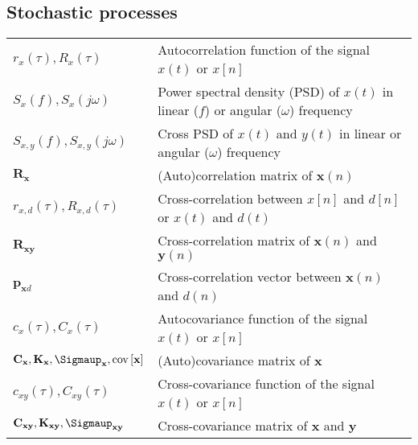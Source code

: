 \documentclass{article}
\begin{document}
\subsection{Stochastic processes}
\begin{xltabular}{\textwidth}{XX}
    \(r_x(\tau), R_x(\tau)\) & Autocorrelation function of the signal \(x(t)\) or \(x[n]\) \cite{nossekAdaptiveArraySignal2015}\\
    \(S_x(f), S_x(j\omega)\) & Power spectral density (PSD) of \(x(t)\) in linear (\(f\)) or angular (\(\omega\)) frequency\\
    \(S_{x,y}(f), S_{x,y}(j\omega)\) & Cross PSD of \(x(t)\) and \(y(t)\) in linear or angular (\(\omega\)) frequency\\
    \(\mathbf{R}_\mathbf{x}\) & (Auto)correlation matrix of \(\mathbf{x}(n)\) \\
    \(r_{x,d}(\tau), R_{x,d}(\tau)\) & Cross-correlation between \(x[n]\) and \(d[n]\) or \(x(t)\) and \(d(t)\) \cite{nossekAdaptiveArraySignal2015}\\
    \(\mathbf{R}_\mathbf{xy}\) & Cross-correlation matrix of \(\mathbf{x}(n)\) and \(\mathbf{y}(n)\)\\
    \(\mathbf{p}_{\mathbf{x}d}\)& Cross-correlation vector between \(\mathbf{x}(n)\) and \(d(n)\) \cite{dinizAdaptiveFiltering1997} \\
    \(c_x(\tau), C_x(\tau)\) & Autocovariance function of the signal \(x(t)\) or \(x[n]\) \cite{nossekAdaptiveArraySignal2015}\\
    \(\mathbf{C}_\mathbf{x}, \mathbf{K}_\mathbf{x}, \boldsymbol{\Sigmaup}_\mathbf{x}, \textnormal{cov}\left[ \mathbf{x} \right]\) & (Auto)covariance matrix of \(\mathbf{x}\) \cite{vantreesOptimumArrayProcessing2002,proakisDigitalCommunications2007,leon-garciaProbabilityStatisticsRandom2007,haykinAdaptiveFilterTheory2002} \\
    \(c_{xy}(\tau), C_{xy}(\tau)\) & Cross-covariance function of the signal \(x(t)\) or \(x[n]\) \cite{nossekAdaptiveArraySignal2015} \\
    \(\mathbf{C}_{\mathbf{xy}}, \mathbf{K}_{\mathbf{xy}}, \boldsymbol{\Sigmaup}_{\mathbf{xy}}\) & Cross-covariance matrix of \(\mathbf{x}\) and \(\mathbf{y}\)
\end{xltabular}
\end{document}

